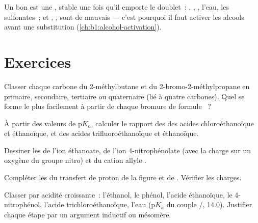 Un bon  est une , stable une fois qu'il emporte
le doublet~: , , , l'eau, les sulfonates~;
 et , , sont de mauvais  ---
c'est pourquoi il faut activer les alcools avant une substitution
(\cref{ch:b1:alcohol-activation}).

\section{Exercices}

\begin{exercise}[$\star$]\label{exo:b1:electronic-effects:1}
Classer chaque carbone du 2-méthylbutane et du 2-bromo-2-méthylpropane
en primaire, secondaire, tertiaire ou quaternaire (lié à quatre
carbones). Quel  se forme le plus facilement à partir de
chaque bromure de formule ~?
\end{exercise}

\begin{exercise}[$\star$]\label{exo:b1:electronic-effects:2}
À partir des valeurs de $\mathrm{p}K_a$, calculer le rapport des
 des acides chloroéthanoïque et éthanoïque, et des
acides trifluoroéthanoïque et éthanoïque.
\end{exercise}

\begin{exercise}[$\star$]\label{exo:b1:electronic-effects:3}
Dessiner les  de l'ion éthanoate, de l'ion
4-nitrophénolate (avec la charge sur un oxygène du groupe nitro) et du
cation allyle .
\end{exercise}

\begin{exercise}[$\star$]\label{exo:b1:electronic-effects:4}
Compléter les  du transfert de proton de la figure et de
. Vérifier les charges.
\end{exercise}

\begin{exercise}[$\star\star$]\label{exo:b1:electronic-effects:5}
Classer par acidité croissante~: l'éthanol, le phénol, l'acide
éthanoïque, le 4-nitrophénol, l'acide trichloroéthanoïque, l'eau
($\mathrm{p}K_a$ du couple /, 14.0). Justifier chaque
étape par un argument inductif ou mésomère.
\end{exercise}

